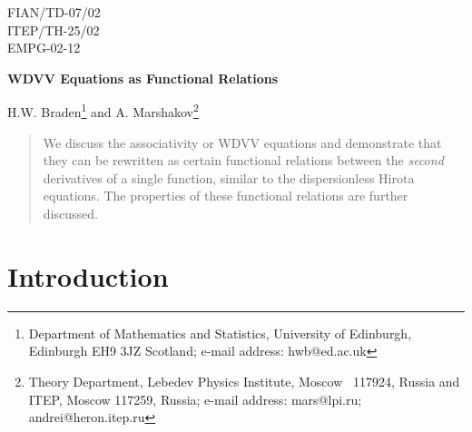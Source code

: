 \documentclass[a4paper,]{article}
\begin{document}
\begin{flushright}
FIAN/TD-07/02\\
ITEP/TH-25/02\\
EMPG-02-12
\end{flushright}
\vspace{0.5cm}

\begin{center}
{\LARGE \bf WDVV Equations as Functional Relations }
\end{center}
\vspace{0.5cm}

\begin{center}
{\Large H.W. Braden\footnote{Department of Mathematics and Statistics,
University of Edinburgh, Edinburgh EH9 3JZ Scotland;
e-mail address: hwb@ed.ac.uk }} {\large and} {\Large
A. Marshakov\footnote{Theory
Department, Lebedev Physics Institute, Moscow
~117924, Russia and ITEP,
Moscow 117259, Russia; e-mail address: mars@lpi.ru;
andrei@heron.itep.ru}}
\\
\end{center}

\begin{quotation}
\noindent
We discuss the associativity or WDVV equations and demonstrate that
they can be rewritten as certain functional relations between the {\it second}
derivatives of a single function, similar to the dispersionless Hirota
equations. The properties of these functional relations are further
discussed.
\end{quotation}


\section{Introduction}
\end{document}
